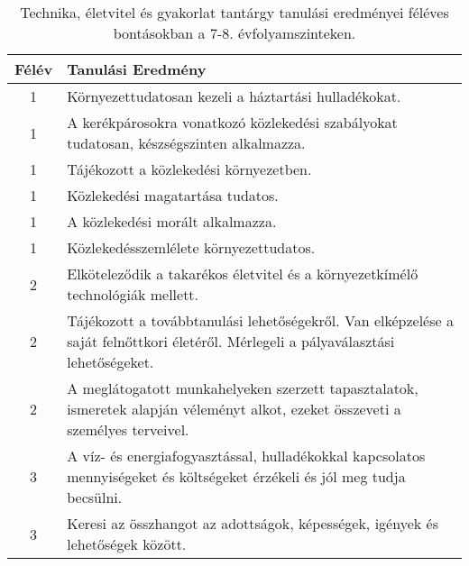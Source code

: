             \clearpage

       
           \begin{longtable}{c | p{} }
            \caption[Technika, életvitel és gyakorlat 7-8.]{Technika, életvitel és gyakorlat tantárgy tanulási eredményei féléves bontásokban a 7-8. évfolyamszinteken. }  \\

            \textbf{Félév} & \textbf{Tanulási Eredmény} \\
            \hline
            \endhead
                                
                                          1 &  Környezettudatosan kezeli a háztartási hulladékokat. \\ \hline
                                          1 &  A kerékpárosokra vonatkozó közlekedési szabályokat tudatosan, készségszinten alkalmazza. \\ \hline
                                          1 &  Tájékozott a közlekedési környezetben. \\ \hline
                                          1 &  Közlekedési magatartása tudatos. \\ \hline
                                          1 &  A közlekedési morált alkalmazza. \\ \hline
                                          1 &  Közlekedésszemlélete környezettudatos. \\ \hline
                                      
                                
                                          2 &  Elköteleződik a takarékos életvitel és a környezetkímélő technológiák mellett. \\ \hline
                                          2 &  Tájékozott a továbbtanulási lehetőségekről. Van elképzelése a saját felnőttkori életéről. Mérlegeli a pályaválasztási lehetőségeket. \\ \hline
                                          2 &  A meglátogatott munkahelyeken szerzett tapasztalatok, ismeretek alapján véleményt alkot, ezeket összeveti a személyes terveivel. \\ \hline
                                      
                                
                                          3 &  A víz- és energiafogyasztással, hulladékokkal kapcsolatos mennyiségeket és költségeket érzékeli és jól meg tudja becsülni. \\ \hline
                                          3 &  Keresi az összhangot az adottságok, képességek, igények és lehetőségek között. \\ \hline
                                      

\end{longtable}

